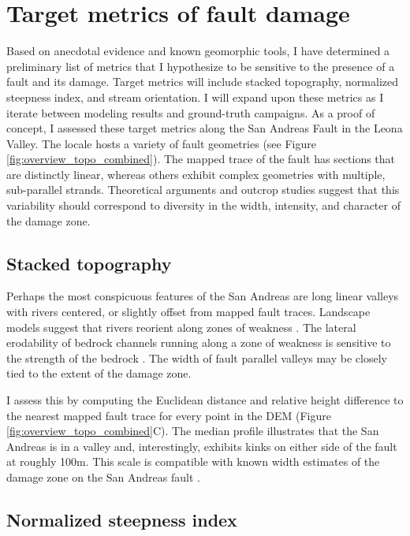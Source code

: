 \documentclass[12pt, notitlepage]{report}
\begin{document}
\section{Target metrics of fault damage}
Based on anecdotal evidence and known geomorphic tools, I have determined a preliminary list of metrics that I hypothesize to be sensitive to the presence of a fault and its damage. Target metrics will include stacked topography, normalized steepness index, and stream orientation. I will expand upon these metrics as I iterate between modeling results and ground-truth campaigns. As a proof of concept, I assessed these target metrics along the San Andreas Fault in the Leona Valley. The locale hosts a variety of fault geometries (see Figure \ref{fig:overview_topo_combined}). The mapped trace of the fault has sections that are distinctly linear, whereas others exhibit complex geometries with multiple, sub-parallel strands. Theoretical arguments and outcrop studies \cite{Faulkner2008OnFaults} suggest that this variability should correspond to diversity in the width, intensity, and character of the damage zone. 

\subsection{Stacked topography} 

Perhaps the most conspicuous features of the San Andreas are long linear valleys with rivers centered, or slightly offset from mapped fault traces. Landscape models suggest that rivers reorient along zones of weakness \cite{Roy2016}. The lateral erodability of bedrock channels running along a zone of weakness is sensitive to the strength of the bedrock \cite{Johnson2015AChannels}. The width of fault parallel valleys may be closely tied to the extent of the damage zone.

I assess this by computing the Euclidean distance and relative height difference to the nearest mapped fault trace for every point in the DEM (Figure  \ref{fig:overview_topo_combined}C). The median profile illustrates that the San Andreas is in a valley and, interestingly, exhibits kinks on either side of the fault at roughly 100m. This scale is compatible with known width estimates of the damage zone on the San Andreas fault \cite{DorGeologicalDirection}.

\subsection{Normalized steepness index} 
\end{document}
